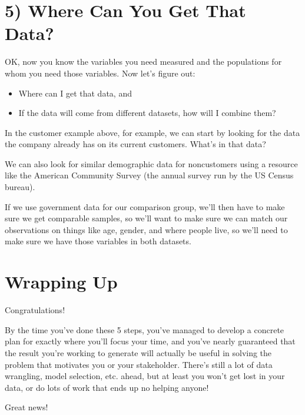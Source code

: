 \documentclass[letterpaper,10pt,english]{jupyterBook}
\begin{document}
\section{5) Where Can You Get That Data?}
\label{\detokenize{40_in_practice/05_backwards_design:where-can-you-get-that-data}}
\sphinxAtStartPar
OK, now you know the variables you need measured and the populations for whom you need those variables. Now let’s figure out:
\begin{itemize}
\item {} 
\sphinxAtStartPar
Where can I get that data, and

\item {} 
\sphinxAtStartPar
If the data will come from different datasets, how will I combine them?

\end{itemize}

\sphinxAtStartPar
In the customer example above, for example, we can start by looking for the data the company already has on its current customers. What’s in that data?

\sphinxAtStartPar
We can also look for similar demographic data for non\sphinxhyphen{}customers using a resource like the American Community Survey (the annual survey run by the US Census bureau).

\sphinxAtStartPar
If we use government data for our comparison group, we’ll then have to make sure we get comparable samples, so we’ll want to make sure we can match our observations on things like age, gender, and where people live, so we’ll need to make sure we have those variables in both datasets.


\section{Wrapping Up}
\label{\detokenize{40_in_practice/05_backwards_design:wrapping-up}}
\sphinxAtStartPar
Congratulations!

\sphinxAtStartPar
By the time you’ve done these 5 steps, you’ve managed to develop a concrete plan for exactly where you’ll focus your time, and you’ve nearly guaranteed that the result you’re working to generate will actually be useful in solving the problem that motivates you or your stakeholder. There’s still a lot of data wrangling, model selection, etc. ahead, but at least you won’t get lost in your data, or do lots of work that ends up no helping anyone!

\sphinxAtStartPar
{} Great news! 
\end{document}
